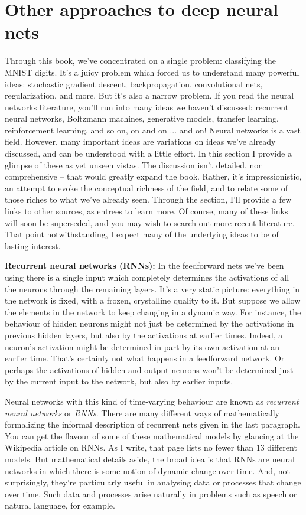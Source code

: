 \documentclass[a4paper,twoside,10pt]{book}
\begin{document}
\section{Other approaches to deep neural nets}
Through this book, we've concentrated on a single problem: classifying the MNIST digits. It's a juicy problem which forced us to understand many powerful ideas: stochastic gradient descent, backpropagation, convolutional nets, regularization, and more. But it's also a narrow problem. If you read the neural networks literature, you'll run into many ideas we haven't discussed: recurrent neural networks, Boltzmann machines, generative models, transfer learning, reinforcement learning, and so on, on and on ... and on! Neural networks is a vast field. However, many important ideas are variations on ideas we've already discussed, and can be understood with a little effort. In this section I provide a glimpse of these as yet unseen vistas. The discussion isn't detailed, nor comprehensive -- that would greatly expand the book. Rather, it's impressionistic, an attempt to evoke the conceptual richness of the field, and to relate some of those riches to what we've already seen. Through the section, I'll provide a few links to other sources, as entrees to learn more. Of course, many of these links will soon be superseded, and you may wish to search out more recent literature. That point notwithstanding, I expect many of the underlying ideas to be of lasting interest.

\textbf{Recurrent neural networks (RNNs):} In the feedforward nets we've been using there is a single input which completely determines the activations of all the neurons through the remaining layers. It's a very static picture: everything in the network is fixed, with a frozen, crystalline quality to it. But suppose we allow the elements in the network to keep changing in a dynamic way. For instance, the behaviour of hidden neurons might not just be determined by the activations in previous hidden layers, but also by the activations at earlier times. Indeed, a neuron's activation might be determined in part by its own activation at an earlier time. That's certainly not what happens in a feedforward network. Or perhaps the activations of hidden and output neurons won't be determined just by the current input to the network, but also by earlier inputs.

Neural networks with this kind of time-varying behaviour are known as \textit{recurrent neural networks} or \textit{RNNs}. There are many different ways of mathematically formalizing the informal description of recurrent nets given in the last paragraph. You can get the flavour of some of these mathematical models by glancing at the Wikipedia article on RNNs. As I write, that page lists no fewer than 13 different models. But mathematical details aside, the broad idea is that RNNs are neural networks in which there is some notion of dynamic change over time. And, not surprisingly, they're particularly useful in analysing data or processes that change over time. Such data and processes arise naturally in problems such as speech or natural language, for example.
\end{document}
